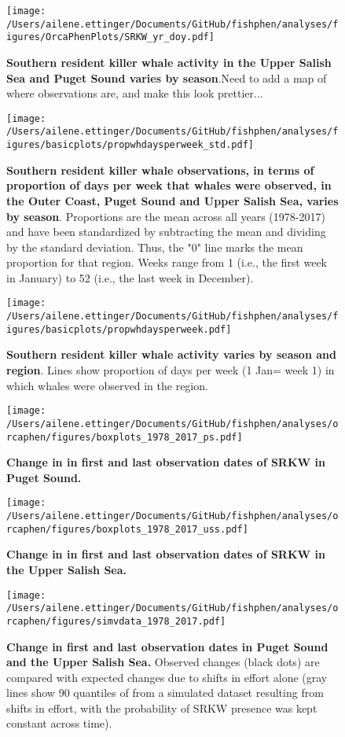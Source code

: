 \documentclass{article}
\begin{document}
\begin{figure}[p]
\texttt{[image: /Users/ailene.ettinger/Documents/GitHub/fishphen/analyses/figures/OrcaPhenPlots/SRKW\_yr\_doy.pdf]} 
\caption{\textbf{Southern resident killer whale activity in the Upper Salish Sea and Puget Sound varies by season}.Need to add a map of where observations are, and make this look prettier...}
 \label{fig:phenplot}
 \end{figure}
 
 \begin{figure}[p]
\texttt{[image: /Users/ailene.ettinger/Documents/GitHub/fishphen/analyses/figures/basicplots/propwhdaysperweek\_std.pdf]} 
\caption{\textbf{Southern resident killer whale observations, in terms of proportion of days per week that whales were observed, in the Outer Coast, Puget Sound and Upper Salish Sea, varies by season}. Proportions are the mean across all years (1978-2017) and have been standardized by subtracting the mean and dividing by the standard deviation. Thus, the "0" line marks the mean proportion for that region. Weeks range from 1 (i.e., the first week in January) to 52 (i.e., the last week in December).}
 \label{fig:phenplot}
 \end{figure}

\begin{figure}[p]
\texttt{[image: /Users/ailene.ettinger/Documents/GitHub/fishphen/analyses/figures/basicplots/propwhdaysperweek.pdf]} 
\caption{\textbf{Southern resident killer whale activity varies by season and region}. Lines show proportion of days per week (1 Jan= week 1) in which whales were observed in the region.}
 \label{fig:phenplot2}
 \end{figure} 
\begin{figure}[p]
\texttt{[image: /Users/ailene.ettinger/Documents/GitHub/fishphen/analyses/orcaphen/figures/boxplots\_1978\_2017\_ps.pdf]} 
\caption{\textbf{Change in in first and last observation dates of SRKW in Puget Sound.} }
 \label{fig:boxplot1}
 \end{figure}
 \begin{figure}[p]
\texttt{[image: /Users/ailene.ettinger/Documents/GitHub/fishphen/analyses/orcaphen/figures/boxplots\_1978\_2017\_uss.pdf]} 
\caption{\textbf{Change in in first and last observation dates of SRKW in the Upper Salish Sea.} }
 \label{fig:boxplot2}
 \end{figure}
 
\begin{figure}[p]
\texttt{[image: /Users/ailene.ettinger/Documents/GitHub/fishphen/analyses/orcaphen/figures/simvdata\_1978\_2017.pdf]} 
\caption{\textbf{Change in first and last observation dates in Puget Sound and the Upper Salish Sea.} Observed changes (black dots) are compared with expected changes due to shifts in effort alone (gray lines show 90 quantiles of from a simulated dataset resulting from shifts in effort, with the probability of SRKW presence was kept constant across time).}
 \label{fig:sim}
 \end{figure}
 
\end{document}

